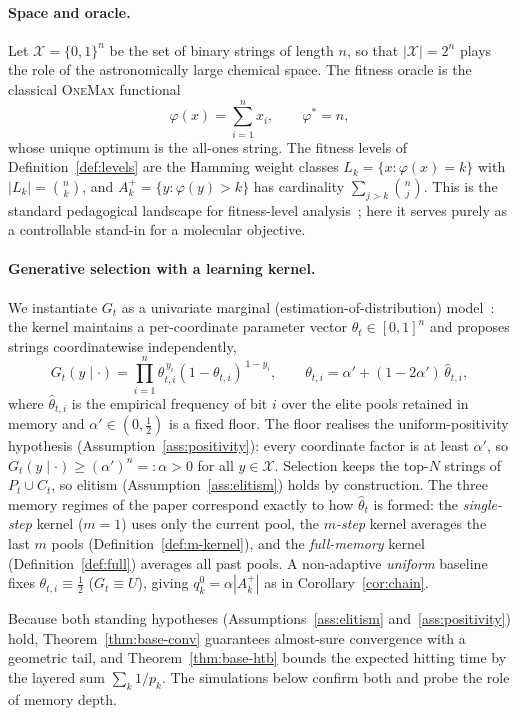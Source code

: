 \documentclass[11pt,a4paper]{article}
\newcommand{\X}{\mathcal{X}}
\newcommand{\phist}{\varphi^*}
\newcommand{\Akp}{A_k^{+}}
\begin{document}
\paragraph{Space and oracle.}
Let $\X=\{0,1\}^n$ be the set of binary strings of length $n$, so that
$|\X|=2^n$ plays the role of the astronomically large chemical space.
The fitness oracle is the classical \textsc{OneMax} functional
\[
  \varphi(x)=\sum_{i=1}^n x_i,\qquad \phist=n,
\]
whose unique optimum is the all-ones string.  The fitness levels of
Definition~\ref{def:levels} are the Hamming weight classes
$L_k=\{x:\varphi(x)=k\}$ with $|L_k|=\binom{n}{k}$, and
$\Akp=\{y:\varphi(y)>k\}$ has cardinality $\sum_{j>k}\binom{n}{j}$.  This
is the standard pedagogical landscape for fitness-level
analysis~\cite{Wegener2001,Jansen2013}; here it serves purely as a
controllable stand-in for a molecular objective.

\paragraph{Generative selection with a learning kernel.}
We instantiate $G_t$ as a univariate marginal (estimation-of-distribution)
model~\cite{HauschildPelikan2011}: the kernel maintains a per-coordinate
parameter vector $\theta_t\in[0,1]^n$ and proposes strings
coordinatewise independently,
\[
  G_t(y\mid\cdot)=\prod_{i=1}^n
     \theta_{t,i}^{\,y_i}(1-\theta_{t,i})^{\,1-y_i},
  \qquad
  \theta_{t,i}=\alpha'+(1-2\alpha')\,\widehat\theta_{t,i},
\]
where $\widehat\theta_{t,i}$ is the empirical frequency of bit $i$ over the
elite pools retained in memory and $\alpha'\in(0,\tfrac12)$ is a fixed
floor.  The floor realises the uniform-positivity hypothesis
(Assumption~\ref{ass:positivity}): every coordinate factor is at least
$\alpha'$, so $G_t(y\mid\cdot)\ge(\alpha')^{n}=:\alpha>0$ for all
$y\in\X$.  Selection keeps the top-$N$ strings of $P_t\cup C_t$, so
elitism (Assumption~\ref{ass:elitism}) holds by construction.  The three memory regimes of the paper
correspond exactly to how $\widehat\theta_t$ is formed: the
\emph{single-step} kernel ($m=1$) uses only the current pool, the
\emph{$m$-step} kernel averages the last $m$ pools
(Definition~\ref{def:m-kernel}), and the \emph{full-memory} kernel
(Definition~\ref{def:full}) averages all past pools.  A non-adaptive
\emph{uniform} baseline fixes $\theta_{t,i}\equiv\tfrac12$
($G_t\equiv U$), giving $q_k^0=\alpha|\Akp|$ as in
Corollary~\ref{cor:chain}.

Because both standing hypotheses (Assumptions~\ref{ass:elitism}
and~\ref{ass:positivity}) hold, Theorem~\ref{thm:base-conv} guarantees
almost-sure convergence with a
geometric tail, and Theorem~\ref{thm:base-htb} bounds the expected hitting time
by the layered sum $\sum_k 1/p_k$.  The simulations below confirm both
and probe the role of memory depth.
\end{document}

